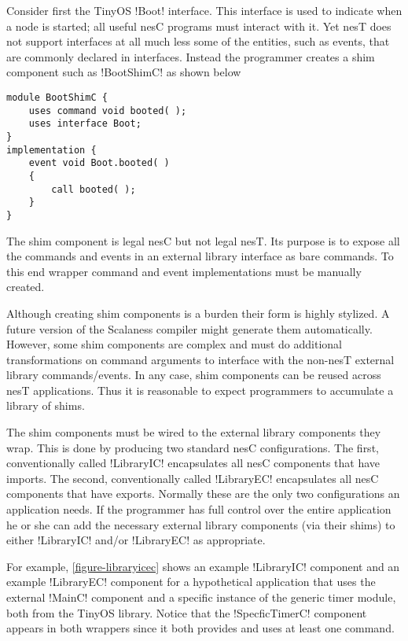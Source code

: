 Consider first the TinyOS !Boot! interface. This interface is used to indicate when a node is
started; all useful nesC programs must interact with it. Yet nesT does not support interfaces at
all much less some of the entities, such as events, that are commonly declared in interfaces.
Instead the programmer creates a shim component such as !BootShimC! as shown below

\singlespace
\vspace{1.0ex}
\begin{lstlisting}[language=nesC]
module BootShimC {
    uses command void booted( );
    uses interface Boot;
}
implementation {
    event void Boot.booted( )
    {
        call booted( );
    }
}
\end{lstlisting}
\vspace{1.0ex}
\primaryspacing

The shim component is legal nesC but not legal nesT. Its purpose is to expose all the commands
and events in an external library interface as bare commands. To this end wrapper command and
event implementations must be manually created.

Although creating shim components is a burden their form is highly stylized. A future version of
the Scalaness compiler might generate them automatically. However, some shim components are
complex and must do additional transformations on command arguments to interface with the
non-nesT external library commands/events. In any case, shim components can be reused across
nesT applications. Thus it is reasonable to expect programmers to accumulate a library of shims.

The shim components must be wired to the external library components they wrap. This is done by
producing two standard nesC configurations. The first, conventionally called !LibraryIC!
encapsulates all nesC components that have imports. The second, conventionally called
!LibraryEC! encapsulates all nesC components that have exports. Normally these are the only two
configurations an application needs. If the programmer has full control over the entire
application he or she can add the necessary external library components (via their shims) to
either !LibraryIC! and/or !LibraryEC! as appropriate.

For example, \autoref{figure-libraryicec} shows an example !LibraryIC! component and an example
!LibraryEC! component for a hypothetical application that uses the external !MainC! component
and a specific instance of the generic timer module, both from the TinyOS library. Notice that
the !SpecficTimerC! component appears in both wrappers since it both provides and uses at least
one command. 

